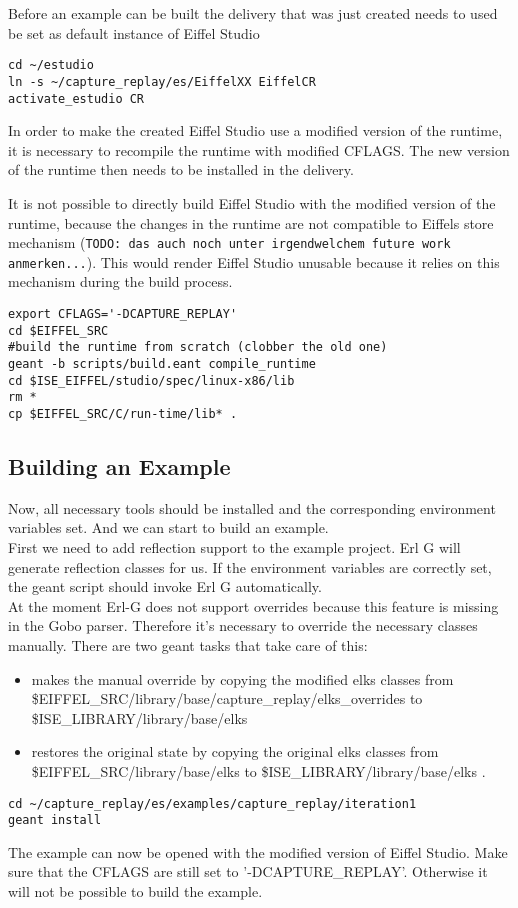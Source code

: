 Before an example can be built the delivery that was just created needs to used be set as default instance of Eiffel Studio
\begin{lstlisting}
cd ~/estudio
ln -s ~/capture_replay/es/EiffelXX EiffelCR
activate_estudio CR
\end{lstlisting}

In order to make the created Eiffel Studio use a modified version of the runtime, it is necessary to recompile the runtime with modified CFLAGS. The new version of the runtime then needs to be installed in the delivery.

It is not possible to directly build Eiffel Studio with the modified version of the runtime, because the changes in the runtime are not compatible to Eiffels store mechanism (\texttt{TODO: das auch noch unter irgendwelchem future work anmerken...}). This would render Eiffel Studio unusable because it relies on this mechanism during the build process.
\begin{lstlisting}
export CFLAGS='-DCAPTURE_REPLAY' 
cd $EIFFEL_SRC
#build the runtime from scratch (clobber the old one)
geant -b scripts/build.eant compile_runtime
cd $ISE_EIFFEL/studio/spec/linux-x86/lib
rm *
cp $EIFFEL_SRC/C/run-time/lib* .
\end{lstlisting}


\subsection{Building an Example}
Now, all necessary tools should be installed and the corresponding environment variables set. And we can start to build an example.\\
First we need to add reflection support to the example project. Erl G will generate reflection classes for us. If the environment variables are correctly set, the geant script should invoke Erl G automatically. \\
At the moment Erl-G does not support overrides because this feature is missing in the Gobo parser. Therefore it's necessary to override the necessary classes manually. There are two geant tasks that take care of this:

\begin{itemize}
\item {} makes the manual override by copying the modified elks classes from \$EIFFEL\_SRC/library/base/capture\_replay/elks\_overrides to \$ISE\_LIBRARY/library/base/elks \\
\item {} restores the original state by copying the original elks classes from \$EIFFEL\_SRC/library/base/elks to \$ISE\_LIBRARY/library/base/elks .
\end{itemize}

\begin{lstlisting}
cd ~/capture_replay/es/examples/capture_replay/iteration1
geant install
\end{lstlisting}

The example can now be opened with the modified version of Eiffel Studio. Make sure that the CFLAGS are still set to '-DCAPTURE\_REPLAY'. Otherwise it will not be possible to build the example.